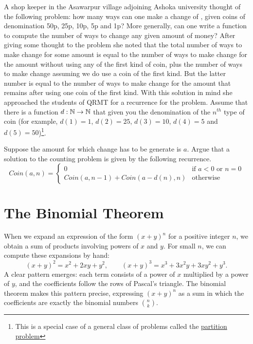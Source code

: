 \begin{example}
 A shop keeper in the Asawarpur village adjoining Ashoka university thought of the following problem: 
      how many ways can one make a change of , given coins of 
      denomination 50p, 25p, 10p, 5p and 1p? More generally, can one write a 
      function to compute the number of ways to change any given amount of 
      money?  After giving some thought to the problem she noted that the 
      total number of ways to make change for some amount is equal to the 
      number of ways to make change for the amount without using any of the 
      first kind of coin, plus the number of ways to make change assuming we 
      do use a coin of the first kind. But the latter number is equal to the 
      number of ways to make change for the amount that remains after using 
      one coin of the first kind.  With this solution in mind she approached 
      the students of QRMT  for a recurrence for the problem. 
      Assume that there is a 
      function $d: \mathbb{N} \rightarrow \mathbb{N}$ that given you the denomination
      of the $n^{th}$ type of coin (for example, $d(1) = 1$, $d(2)=25$, $d(3) = 10$, $d(4)=5$ and
      $d(5) = 50$)\footnote{This is a special case of a general class of problems called the \href{https://en.wikipedia.org/wiki/Integer_partition}{partition problem}}.
\end{example}
\begin{exercise}
Suppose the amount for which change has to be generate is $a$. Argue that a solution to the counting problem is given by the following recurrence.
\[
Coin(a,n) = \left\{ 
            \begin{array}{ll}
            0 & \mbox{if $a < 0$ or $n = 0$} \\
             Coin(a,n-1) + Coin(a-d(n),n) & \mbox{otherwise}
            \end{array}
           \right.
\]

\end{exercise}


\section{The Binomial Theorem}\label{sec:binomial-theorem}

When we expand an expression of the form $(x+y)^n$ for a positive integer $n$,
we obtain a sum of products involving powers of $x$ and $y$. For small $n$, we
can compute these expansions by hand:
\[
(x+y)^2 = x^2 + 2xy + y^2, \qquad
(x+y)^3 = x^3 + 3x^2y + 3xy^2 + y^3.
\]
A clear pattern emerges: each term consists of a power of $x$ multiplied by a
power of $y$, and the coefficients follow the rows of Pascal's triangle. The
binomial theorem makes this pattern precise, expressing $(x+y)^n$ as a sum in
which the coefficients are exactly the binomial numbers $\binom{n}{k}$.

